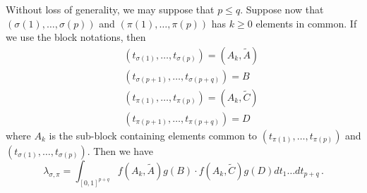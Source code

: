 \documentclass[12pt,a4paper]{book}
\begin{document}
Without loss of generality, we may suppose that $p\leq q$. Suppose now that
$(\sigma(1),\ldots,\sigma(p))$ and $(\pi(1),\ldots,\pi(p))$ has $k\geq0$
elements in common. If we use the block notations, then
\begin{eqnarray*}
& & (t_{\sigma(1)},\ldots,t_{\sigma(p)})=(A_k,\tilde{A}) \\
& & (t_{\sigma(p+1)},\ldots,t_{\sigma(p+q)})=B \\
& & (t_{\pi(1)},\ldots,t_{\pi(p)})=(A_k,\tilde{C}) \\
& & (t_{\pi(p+1)},\ldots,t_{\pi(p+q)})=D
\end{eqnarray*}
where $A_k$ is the sub-block containing elements common to
$(t_{\pi(1)},\ldots,t_{\pi(p)})$ and $(t_{\sigma(1)},\ldots,t_{\sigma(p)})$.
Then we have
$$\lambda_{\sigma,\pi}=\int_{[0,1]^{p+q}}f(A_k,\tilde{A})g(B)\cdot
f(A_k,\tilde{C})g(D)dt_1\ldots dt_{p+q}\,.$$
\end{document}
